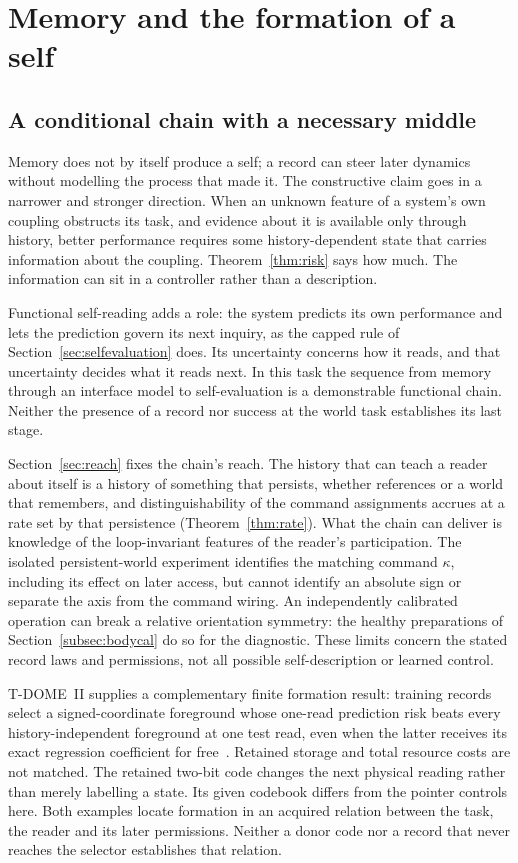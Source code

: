\documentclass[11pt,a4paper]{article}
\begin{document}
\section{Memory and the formation of a self}\label{sec:self}

\subsection{A conditional chain with a necessary middle}

Memory does not by itself produce a self; a record can steer later dynamics without modelling the process that made it. The constructive claim goes in a narrower and stronger direction. When an unknown feature of a system's own coupling obstructs its task, and evidence about it is available only through history, better performance requires some history-dependent state that carries information about the coupling. Theorem~\ref{thm:risk} says how much. The information can sit in a controller rather than a description.

Functional self-reading adds a role: the system predicts its own performance and lets the prediction govern its next inquiry, as the capped rule of Section~\ref{sec:selfevaluation} does. Its uncertainty concerns how it reads, and that uncertainty decides what it reads next. In this task the sequence from memory through an interface model to self-evaluation is a demonstrable functional chain. Neither the presence of a record nor success at the world task establishes its last stage.

Section~\ref{sec:reach} fixes the chain's reach. The history that can teach a reader about itself is a history of something that persists, whether references or a world that remembers, and distinguishability of the command assignments accrues at a rate set by that persistence (Theorem~\ref{thm:rate}). What the chain can deliver is knowledge of the loop-invariant features of the reader's participation. The isolated persistent-world experiment identifies the matching command $\kappa$, including its effect on later access, but cannot identify an absolute sign or separate the axis from the command wiring. An independently calibrated operation can break a relative orientation symmetry: the healthy preparations of Section~\ref{subsec:bodycal} do so for the diagnostic. These limits concern the stated record laws and permissions, not all possible self-description or learned control.

T-DOME~II supplies a complementary finite formation result: training
records select a signed-coordinate foreground whose one-read prediction
risk beats every history-independent foreground at one test read, even
when the latter receives its exact regression coefficient for free~\cite{TDII}.
Retained storage and total resource costs are not matched. The retained
two-bit code changes the next physical
reading rather than merely labelling a state. Its given codebook differs
from the pointer controls here. Both examples locate formation in an
acquired relation between the task, the reader and its later permissions.
Neither a donor code nor a record that never reaches the selector
establishes that relation.
\end{document}
